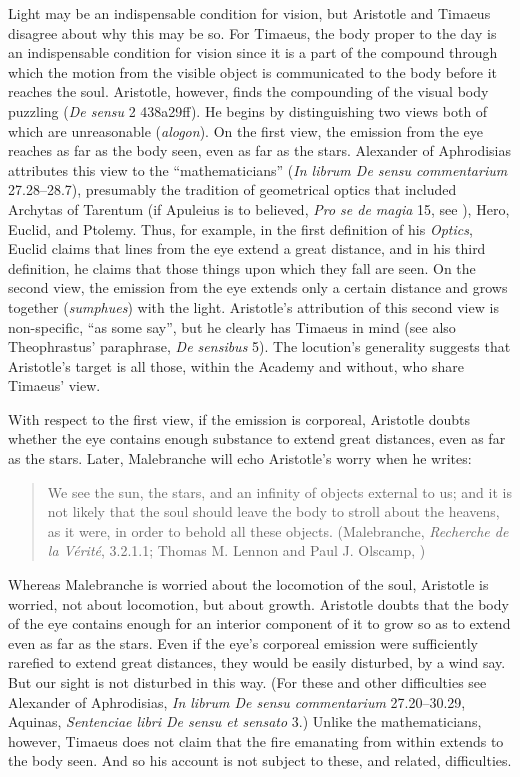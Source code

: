 Light may be an indispensable condition for vision, but Aristotle and Timaeus disagree about why this may be so. For Timaeus, the body proper to the day is an indispensable condition for vision since it is a part of the compound through which the motion from the visible object is communicated to the body before it reaches the soul. Aristotle, however, finds the compounding of the visual body puzzling (\emph{De sensu} 2 438a29ff). He begins by distinguishing two views both of which are unreasonable (\emph{alogon}). On the first view, the emission from the eye reaches as far as the body seen, even as far as the stars. Alexander of Aphrodisias attributes this view to the ``mathematicians'' (\emph{In librum De sensu commentarium} 27.28--28.7), presumably the tradition of geometrical optics that included Archytas of Tarentum (if Apuleius is to believed, \emph{Pro se de magia} 15, see \citealt{Burnyeat:2005rc}), Hero, Euclid, and Ptolemy. Thus, for example, in the first definition of his \emph{Optics}, Euclid claims that lines from the eye extend a great distance, and in his third definition, he claims that those things upon which they fall are seen. On the second view, the emission from the eye extends only a certain distance and grows together (\emph{sumphues}) with the light. Aristotle's attribution of this second view is non-specific, ``as some say'', but he clearly has Timaeus in mind (see also Theophrastus' paraphrase, \emph{De sensibus} 5). The locution's generality suggests that Aristotle's target is all those, within the Academy and without, who share Timaeus' view.

With respect to the first view, if the emission is corporeal, Aristotle doubts whether the eye contains enough substance to extend great distances, even as far as the stars. Later, Malebranche will echo Aristotle's worry when he writes:
\begin{quote}
	We see the sun, the stars, and an infinity of objects external to us; and it is not likely that the soul should leave the body to stroll about the heavens, as it were, in order to behold all these objects. (Malebranche, \emph{Recherche de la V\'{e}rit\'{e}}, 3.2.1.1; Thomas M. Lennon and Paul J. Olscamp, \citeyear[217]{Malebranche:1997sf})
\end{quote}
Whereas Malebranche is worried about the locomotion of the soul, Aristotle is worried, not about locomotion, but about growth. Aristotle doubts that the body of the eye contains enough for an interior component of it to grow so as to extend even as far as the stars. Even if the eye's corporeal emission were sufficiently rarefied to extend great distances, they would be easily disturbed, by a wind say. But our sight is not disturbed in this way.  (For these and other difficulties see Alexander of Aphrodisias, \emph{In librum De sensu commentarium} 27.20--30.29, Aquinas, \emph{Sentenciae libri De sensu et sensato} 3.) Unlike the mathematicians, however, Timaeus does not claim that the fire emanating from within extends to the body seen. And so his account is not subject to these, and related, difficulties.

